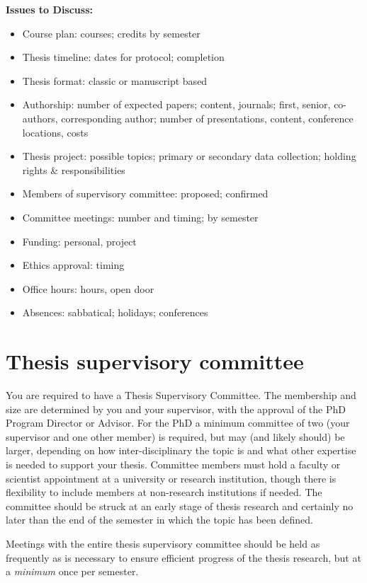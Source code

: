 \documentclass[
  letterpaper,
  DIV=11,
  numbers=noendperiod]{scrreprt}
\providecommand{\tightlist}{%
  \setlength{\itemsep}{0pt}\setlength{\parskip}{0pt}}
\begin{document}
\textbf{Issues to Discuss:}

\begin{itemize}
\tightlist
\item
  Course plan: courses; credits by semester
\item
  Thesis timeline: dates for protocol; completion
\item
  Thesis format: classic or manuscript based
\item
  Authorship: number of expected papers; content, journals; first,
  senior, co-authors, corresponding author; number of presentations,
  content, conference locations, costs
\item
  Thesis project: possible topics; primary or secondary data collection;
  holding rights \& responsibilities
\item
  Members of supervisory committee: proposed; confirmed
\item
  Committee meetings: number and timing; by semester
\item
  Funding: personal, project
\item
  Ethics approval: timing
\item
  Office hours: hours, open door
\item
  Absences: sabbatical; holidays; conferences
\end{itemize}

\section{Thesis supervisory
committee}\label{thesis-supervisory-committee}

You are required to have a Thesis Supervisory Committee. The membership
and size are determined by you and your supervisor, with the approval of
the PhD Program Director or Advisor. For the PhD a minimum committee of
two (your supervisor and one other member) is required, but may (and
likely should) be larger, depending on how inter-disciplinary the topic
is and what other expertise is needed to support your thesis. Committee
members must hold a faculty or scientist appointment at a university or
research institution, though there is flexibility to include members at
non-research institutions if needed. The committee should be struck at
an early stage of thesis research and certainly no later than the end of
the semester in which the topic has been defined.

Meetings with the entire thesis supervisory committee should be held as
frequently as is necessary to ensure efficient progress of the thesis
research, but at a \emph{minimum} once per semester.
\end{document}
